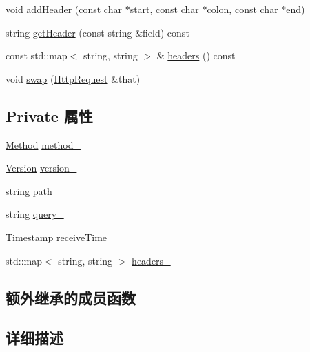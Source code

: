 \begin{DoxyCompactItemize}
void \hyperlink{classmuduo_1_1net_1_1HttpRequest_a48ace9b45f10aa737bd1eea3c55f52c8}{add\+Header} (const char $\ast$start, const char $\ast$colon, const char $\ast$end)
\item 
string \hyperlink{classmuduo_1_1net_1_1HttpRequest_af5100c1c41231c455c4396cce9487b59}{get\+Header} (const string \&field) const
\item 
const std\+::map$<$ string, string $>$ \& \hyperlink{classmuduo_1_1net_1_1HttpRequest_a3773f72b8357f427a4ac84d6645eaf76}{headers} () const
\item 
void \hyperlink{classmuduo_1_1net_1_1HttpRequest_a175188d59044234c59dcec6513a685b4}{swap} (\hyperlink{classmuduo_1_1net_1_1HttpRequest}{Http\+Request} \&that)
\end{DoxyCompactItemize}
\subsection*{Private 属性}
\begin{DoxyCompactItemize}
\item 
\hyperlink{classmuduo_1_1net_1_1HttpRequest_a2a3c0067e44c5ef3210a256d06c16b0f}{Method} \hyperlink{classmuduo_1_1net_1_1HttpRequest_a976da067e26411726fa98bb844e15a12}{method\+\_\+}
\item 
\hyperlink{classmuduo_1_1net_1_1HttpRequest_a2256f5bba1c1c69a92b933aa501df470}{Version} \hyperlink{classmuduo_1_1net_1_1HttpRequest_a07754d309f529cabe538621cfee76611}{version\+\_\+}
\item 
string \hyperlink{classmuduo_1_1net_1_1HttpRequest_ab81b8f6431abce193e0fba6d67758aa9}{path\+\_\+}
\item 
string \hyperlink{classmuduo_1_1net_1_1HttpRequest_aaaa76f32332cb6e06f63911054261bbb}{query\+\_\+}
\item 
\hyperlink{classmuduo_1_1Timestamp}{Timestamp} \hyperlink{classmuduo_1_1net_1_1HttpRequest_a6cad1a09867c7e0c4939d9fb93df8008}{receive\+Time\+\_\+}
\item 
std\+::map$<$ string, string $>$ \hyperlink{classmuduo_1_1net_1_1HttpRequest_a5399fcc713a2d468facbbcc1e84999cf}{headers\+\_\+}
\end{DoxyCompactItemize}
\subsection*{额外继承的成员函数}


\subsection{详细描述}


